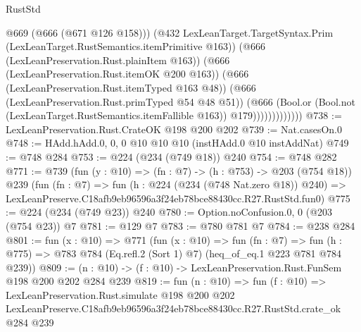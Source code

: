\begin{lexlean}{RustStd}
\begin{coremodule}
                            @669
                            (@666 (@671 @126 @158)))
                          (@432
                            LexLeanTarget.TargetSyntax.Prim
                            (LexLeanTarget.RustSemantics.itemPrimitive @163))
                          (@666 (LexLeanPreservation.Rust.plainItem @163))
                          (@666 (LexLeanPreservation.Rust.itemOK @200 @163))
                          (@666 (LexLeanPreservation.Rust.itemTyped @163 @48))
                          (@666 (LexLeanPreservation.Rust.primTyped @54 @48 @51))
                          (@666
                            (Bool.or
                              (Bool.not (LexLeanTarget.RustSemantics.itemFallible @163))
                              @179)))))))))))))
@738 := LexLeanPreservation.Rust.CrateOK @198 @200 @202
@739 := Nat.casesOn.{0}
@748 := HAdd.hAdd.{0, 0, 0} @10 @10 @10 (instHAdd.{0} @10 instAddNat)
@749 := @748 @284
@753 := @224 (@234 (@749 @18)) @240
@754 := @748 @282
@771 := @739
    (fun (y : @10) => (fn : @7) -> (h : @753) -> @203 (@754 @18))
    @239
    (fun (fn : @7) =>
    fun (h : @224 (@234 (@748 Nat.zero @18)) @240) =>
    LexLeanPreserve.C18afb9eb96596a3f24eb78bce88430cc.R27.RustStd.fun0)
@775 := @224 (@234 (@749 @23)) @240
@780 := Option.noConfusion.{0, 0} (@203 (@754 @23)) @7
@781 := @129 @7
@783 := @780 @781 @7
@784 := @238 @284
@801 := fun (x : @10) =>
  @771
    (fun (x : @10) =>
    fun (fn : @7) =>
    fun (h : @775) => @783 @784 (Eq.refl.{2} (Sort 1) @7) (heq_of_eq.{1} @223 @781 @784 @239))
@809 := (n : @10) -> (f : @10) -> LexLeanPreservation.Rust.FunSem @198 @200 @202 @284 @239
@819 := fun (n : @10) =>
  fun (f : @10) =>
  LexLeanPreservation.Rust.simulate
    @198
    @200
    @202
    LexLeanPreserve.C18afb9eb96596a3f24eb78bce88430cc.R27.RustStd.crate_ok
    @284
    @239
\end{coremodule}
\end{lexlean}
